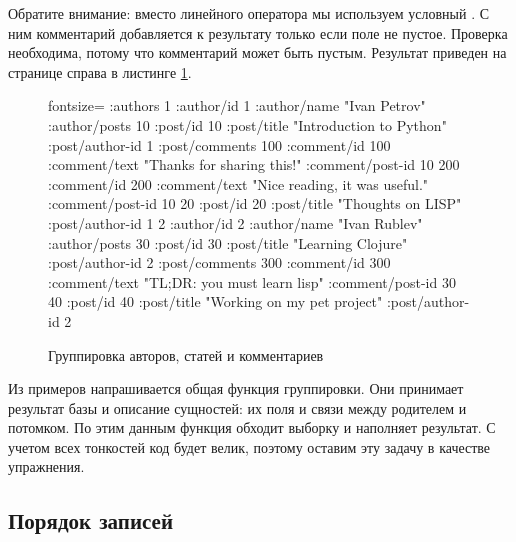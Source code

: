 Обратите внимание: вместо линейного оператора \code{\arr} мы используем условный . С ним комментарий добавляется к результату только если поле  не пустое. Проверка необходима, потому что комментарий может быть пустым. Результат приведен на странице справа в листинге \ref{lis:nested-result}.

\begin{figure}[ht!]

\begin{english}
  \begin{clojure*}{fontsize=\small}
{:authors
 {1 {:author/id 1
     :author/name "Ivan Petrov"
     :author/posts
       {10 {:post/id 10
            :post/title "Introduction to Python"
            :post/author-id 1
            :post/comments
              {100 {:comment/id 100
                    :comment/text "Thanks for sharing this!"
                    :comment/post-id 10}
               200 {:comment/id 200
                    :comment/text "Nice reading, it was useful."
                    :comment/post-id 10}}}
        20 {:post/id 20
            :post/title "Thoughts on LISP"
            :post/author-id 1}}}
  2 {:author/id 2
     :author/name "Ivan Rublev"
     :author/posts
       {30 {:post/id 30
            :post/title "Learning Clojure"
            :post/author-id 2
            :post/comments
              {300 {:comment/id 300
                    :comment/text "TL;DR: you must learn lisp"
                    :comment/post-id 30}}}
        40 {:post/id 40
            :post/title "Working on my pet project"
            :post/author-id 2}}}}}
  \end{clojure*}
\end{english}


\caption{Группировка авторов, статей и комментариев}
\label{lis:nested-result}

\end{figure}

Из примеров напрашивается общая функция группировки. Они принимает результат базы и описание сущностей: их поля и связи между родителем и потомком. По этим данным функция обходит выборку и наполняет результат. С учетом всех тонкостей код будет велик, поэтому оставим эту задачу в качестве упражнения.

\subsection{Порядок записей}

